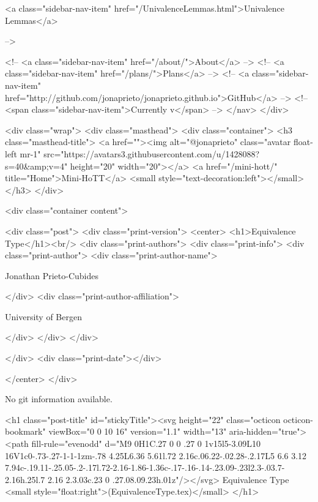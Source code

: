           <a class="sidebar-nav-item" href="/UnivalenceLemmas.html">Univalence Lemmas</a>
        
      
     -->

    <!-- <a class="sidebar-nav-item" href="/about/">About</a> -->
    <!-- <a class="sidebar-nav-item" href="/plans/">Plans</a> -->
    <!-- <a class="sidebar-nav-item" href="http://github.com/jonaprieto/jonaprieto.github.io">GitHub</a> -->
    <!-- <span class="sidebar-nav-item">Currently v</span> -->
  </nav>
</div>

    <div class="wrap">
      <div class="masthead">
        <div class="container">
          <h3 class="masthead-title">
            <a href=""><img alt="@jonaprieto" class="avatar float-left mr-1" src="https://avatars3.githubusercontent.com/u/1428088?s=40&amp;v=4" height="20" width="20"></a>
            <a href="/mini-hott/" title="Home">Mini-HoTT</a>
            <small style="text-decoration:left"></small>
          </h3>
        </div>
      
      <div class="container content">
        







<div class="post">
  <div class="print-version">
    <center>
      <h1>Equivalence Type</h1><br/>
        <div class="print-authors">
          <div class="print-info">
            <div class="print-author">
              <div class="print-author-name">
                
                  Jonathan Prieto-Cubides
                
              </div>
              <div class="print-author-affiliation">
                
                  University of Bergen
                
                </div>
            </div>
          </div>
          
          
        </div>
        <div class="print-date"></div>
        
        
    </center>
  </div>

  
  No git information available.
  

  <h1 class="post-title" id="stickyTitle"><svg height="22" class="octicon octicon-bookmark" viewBox="0 0 10 16" version="1.1" width="13" aria-hidden="true"><path fill-rule="evenodd" d="M9 0H1C.27 0 0 .27 0 1v15l5-3.09L10 16V1c0-.73-.27-1-1-1zm-.78 4.25L6.36 5.61l.72 2.16c.06.22-.02.28-.2.17L5 6.6 3.12 7.94c-.19.11-.25.05-.2-.17l.72-2.16-1.86-1.36c-.17-.16-.14-.23.09-.23l2.3-.03.7-2.16h.25l.7 2.16 2.3.03c.23 0 .27.08.09.23h.01z"/></svg> Equivalence Type <small style="float:right">(EquivalenceType.tex)</small>
  </h1>

